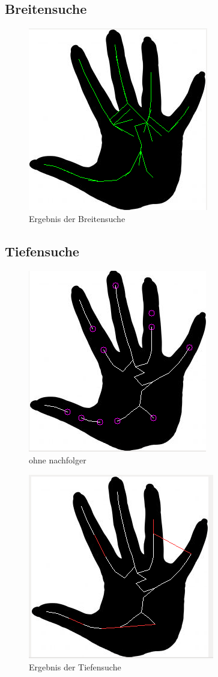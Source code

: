 \subsection{Breitensuche}
\label{subsec:breitesuche}
\begin{figure}
\centering
\includegraphics[width=0.4\linewidth]{./fig/hand_BFS}
\caption{Ergebnis der Breitensuche}
\label{fig:hand_BFS}
\end{figure}
\subsection{Tiefensuche}
\begin{figure}
\centering
\includegraphics[width=0.4\linewidth]{./fig/hand-punkte-ohne-nachfolger}
\caption{ohne nachfolger}
\label{fig:hand-punkte-ohne-nachfolger}
\end{figure}
\label{subsec:tiefensuche}
\begin{figure}
\centering
\includegraphics[width=0.4\linewidth]{./fig/hand-DFS}
\caption{Ergebnis der Tiefensuche}
\label{fig:hand-DFS}
\end{figure}